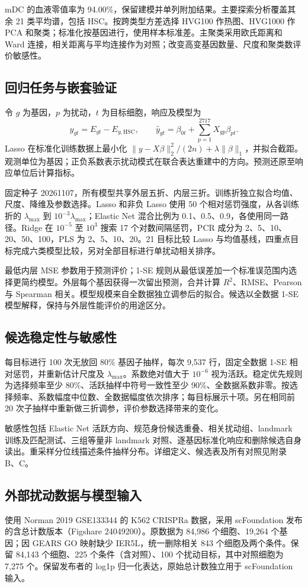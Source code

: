 \documentclass[UTF8,a4paper,11pt,fontset=fandol]{ctexart}
\begin{document}
mDC 的血液零值率为 94.00\%，保留建模并单列附加结果。主要探索分析覆盖其余 21 类平均谱，包括 HSC。按跨类型方差选择 HVG100 作热图、HVG1000 作 PCA 和聚类；标准化按基因进行，使用样本标准差。主聚类采用欧氏距离和 Ward 连接，相关距离与平均连接作为对照；改变高变基因数量、尺度和聚类数评价敏感性。
\subsection{回归任务与嵌套验证}
令 $g$ 为基因，$p$ 为扰动，$t$ 为目标细胞，响应及模型为
\begin{equation}
 y_{gt}=E_{gt}-E_{g,\mathrm{HSC}},\qquad
 \widehat y_{gt}=\beta_{0t}+\sum_{p=1}^{2717}X_{gp}\beta_{pt}.
\end{equation}
Lasso 在标准化训练数据上最小化 $\|y-X\beta\|_2^2/(2n)+\lambda\|\beta\|_1$，并拟合截距。观测单位为基因；正负系数表示扰动模式在联合表达重建中的方向。预测还原至响应单位后计算指标。

固定种子 20261107，所有模型共享外层五折、内层三折。训练折独立拟合均值、尺度、降维及参数选择。Lasso 和非负 Lasso 使用 50 个相对惩罚强度，从各训练折的 $\lambda_{\max}$ 到 $10^{-3}\lambda_{\max}$；Elastic Net 混合比例为 0.1、0.5、0.9，各使用同一路径。Ridge 在 $10^{-5}$ 至 $10^{3}$ 搜索 17 个对数间隔惩罚，PCR 成分为 2、5、10、20、50、100，PLS 为 2、5、10、20。21 目标比较 Lasso 与均值基线，四重点目标完成六类模型比较，另对全部目标进行单扰动相关排序。

最低内层 MSE 参数用于预测评价；1-SE 规则从最低误差加一个标准误范围内选择更简约模型。外层每个基因获得一次留出预测，合并计算 $R^2$、RMSE、Pearson 与 Spearman 相关。模型规模来自全数据独立调参后的拟合。候选以全数据 1-SE 模型解释，保持与外层性能评价的用途区分。
\subsection{候选稳定性与敏感性}
每目标进行 100 次无放回 80\% 基因子抽样，每次 9,537 行，固定全数据 1-SE 相对惩罚，并重新估计尺度及 $\lambda_{\max}$。系数绝对值大于 $10^{-6}$ 视为活跃。稳定优先规则为选择频率至少 80\%、活跃抽样中符号一致性至少 90\%、全数据系数非零。按选择频率、系数幅度中位数、全数据幅度依次排序；每目标展示十项。另在相同前 20 次子抽样中重新做三折调参，评价参数选择带来的变化。

敏感性包括 Elastic Net 活跃方向、规范身份候选重叠、相关扰动组、landmark 训练及匹配测试、三组等量非 landmark 对照、逐基因标准化响应和删除候选自身读出。重采样分位线描述条件抽样分布。详细定义、候选表及所有对照见附录 B、C。

\clearpage
\subsection{外部扰动数据与模型输入}
使用 Norman 2019 GSE133344 的 K562 CRISPRa 数据\cite{R11}，采用 scFoundation 发布的含总计数版本（Figshare 24049200）。原数据为 84,986 个细胞、19,264 个基因；因 GEARS GO 映射缺少 IER5L，统一删除相关 843 个细胞及两个条件。保留 84,143 个细胞、225 个条件（含对照）、100 个扰动目标，其中对照细胞为 7,275 个。保留发布者的 log1p 归一化表达，原始总计数独立用于 scFoundation 输入。
\end{document}
